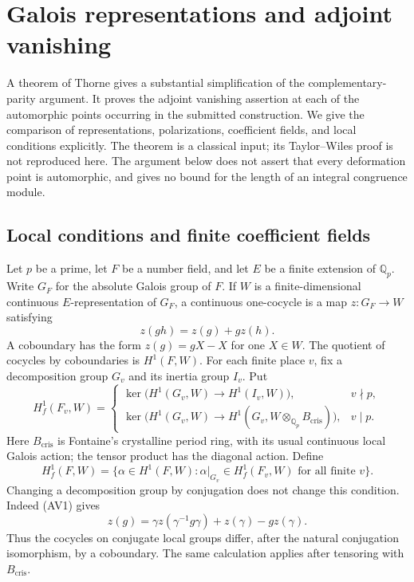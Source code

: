 \section{Galois representations and adjoint vanishing}
\label{av-section}

A theorem of Thorne gives a substantial simplification of the
complementary-parity argument. It proves the adjoint vanishing
assertion at each of the automorphic points occurring in the
submitted construction. We give the comparison of representations,
polarizations, coefficient fields, and local conditions explicitly.
The theorem is a classical input; its Taylor--Wiles proof is not
reproduced here. The argument below does not assert that every
deformation point is automorphic, and gives no bound for the length
of an integral congruence module.

\subsection{Local conditions and finite coefficient fields}

Let $p$ be a prime, let $F$ be a number field, and let $E$ be a
finite extension of $\mathbb Q_p$. Write $G_F$ for the absolute
Galois group of $F$. If $W$ is a finite-dimensional continuous
$E$-representation of $G_F$, a continuous one-cocycle is a map
$z:G_F\longrightarrow W$ satisfying
\[
                    z(gh)=z(g)+g z(h).                         \tag{AV1}
\]
A coboundary has the form $z(g)=gX-X$ for one $X\in W$.
The quotient of cocycles by coboundaries is $H^1(F,W)$.
For each finite place $v$, fix a decomposition group $G_v$
and its inertia group $I_v$. Put
\[
 H^1_f(F_v,W)=
 \begin{cases}
 \ker\bigl(H^1(G_v,W)\longrightarrow H^1(I_v,W)\bigr),&v\nmid p,\\
 \ker\bigl(H^1(G_v,W)\longrightarrow
       H^1(G_v,W\otimes_{\mathbb Q_p}B_{\mathrm{cris}})\bigr),&v\mid p.
 \end{cases}                                                   \tag{AV2}
\]
Here $B_{\mathrm{cris}}$ is Fontaine's crystalline period ring,
with its usual continuous local Galois action; the tensor product
has the diagonal action. Define
\[
 H^1_f(F,W)=\{\alpha\in H^1(F,W):
                    \alpha|_{G_v}\in H^1_f(F_v,W)\text{ for all finite }v\}.
                                                               \tag{AV3}
\]
Changing a decomposition group by conjugation does not change
this condition. Indeed (AV1) gives
\[
 z(g)=\gamma z(\gamma^{-1}g\gamma)+z(\gamma)-g z(\gamma).
                                                               \tag{AV4}
\]
Thus the cocycles on conjugate local groups differ, after the
natural conjugation isomorphism, by a coboundary. The same
calculation applies after tensoring with $B_{\mathrm{cris}}$.

